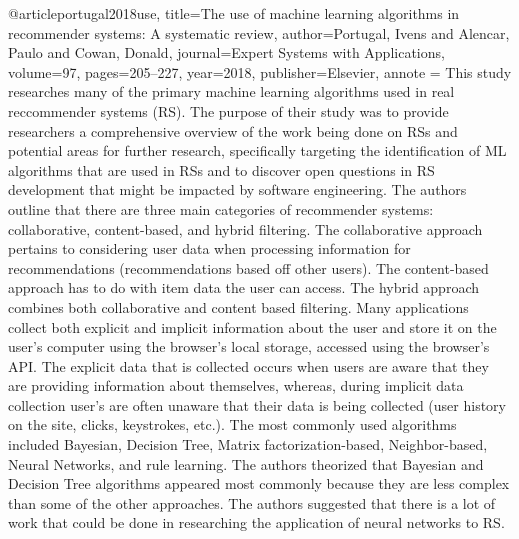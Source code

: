 @article{portugal2018use,
  title={The use of machine learning algorithms in recommender systems: A systematic review},
  author={Portugal, Ivens and Alencar, Paulo and Cowan, Donald},
  journal={Expert Systems with Applications},
  volume={97},
  pages={205--227},
  year={2018},
  publisher={Elsevier},
  annote = {
  This study researches many of the primary machine learning algorithms used in real reccommender systems (RS). The purpose of their study was to provide researchers a comprehensive overview
  of the work being done on RSs and potential areas for further research, specifically targeting the identification of ML algorithms that are used in RSs and to discover open questions in RS development that might be impacted
  by software engineering. The authors outline that there are three main categories of recommender systems: collaborative, content-based, and hybrid filtering.
  The collaborative approach pertains to considering user data when processing information for recommendations (recommendations based off other users). The content-based approach has to do with item data the
  user can access. The hybrid approach combines both collaborative and content based filtering. Many applications collect both explicit and implicit information about the user and store it on the
  user's computer using the browser's local storage, accessed using the browser's API. The explicit data that is collected occurs when users are aware that they are providing information
  about themselves, whereas, during implicit data collection user's are often unaware that their data is being collected (user history on the site, clicks, keystrokes, etc.). The most commonly used algorithms included Bayesian,
  Decision Tree, Matrix factorization-based, Neighbor-based, Neural Networks, and rule learning. The authors theorized that Bayesian and Decision Tree algorithms appeared most commonly because they are less complex than some of
  the other approaches. The authors suggested that there is a lot of work that could be done in researching the application of neural networks to RS.
  }
}
  
